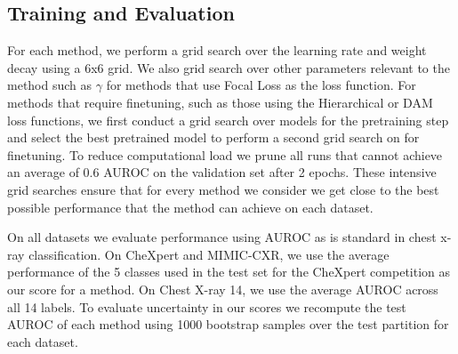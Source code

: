 \subsection{Training and Evaluation}
For each method, we perform a grid search over the learning rate and weight decay using a 6x6 grid. We also grid search over  other parameters relevant to the method such as $\gamma$ for methods that use Focal Loss as the loss function. For methods that require finetuning, such as those using the Hierarchical or DAM loss functions, we first conduct a grid search over models for the pretraining step and select the best pretrained model to perform a second grid search on for finetuning. To reduce computational load we prune all runs that cannot achieve an average of 0.6 AUROC on the validation set after 2 epochs. These intensive grid searches ensure that for every method we consider we get close to the best possible performance that the method can achieve on each dataset.

On all datasets we evaluate performance using AUROC as is standard in chest x-ray classification. On CheXpert and MIMIC-CXR, we use the average performance of the 5 classes used in the test set for the CheXpert competition as our score for a method. On Chest X-ray 14, we use the average AUROC across all 14 labels. To evaluate uncertainty in our scores we recompute the test AUROC of each method using 1000 bootstrap samples over the test partition for each dataset. 


